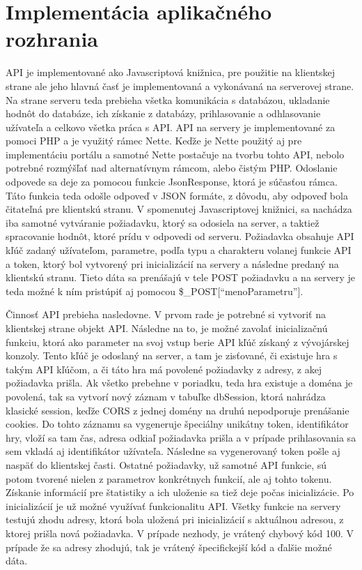 \section{Implementácia aplikačného rozhrania}
API je implementované ako Javascriptová knižnica, pre použitie na klientskej strane ale jeho hlavná časť je implementovaná a vykonávaná na serverovej strane. Na strane serveru teda prebieha všetka komunikácia s databázou, ukladanie hodnôt do databáze, ich získanie z databázy, prihlasovanie a odhlasovanie užívateľa a celkovo všetka práca s API. API na servery je implementované za pomoci PHP a je využitý rámec Nette. Keďže je Nette použitý aj pre implementáciu portálu a samotné Nette postačuje na tvorbu tohto API, nebolo potrebné rozmýšľať nad alternatívnym rámcom, alebo čistým PHP. Odoslanie odpovede sa deje za pomocou funkcie JsonResponse, ktorá je súčasťou rámca. Táto funkcia teda odošle odpoveď v JSON formáte, z dôvodu, aby odpoveď bola čitateľná pre klientskú stranu.  V spomenutej Javascriptovej knižnici, sa nachádza iba samotné vytváranie požiadavku, ktorý sa odosiela na server, a taktiež spracovanie hodnôt, ktoré prídu v odpovedi od serveru. Požiadavka obsahuje API kľúč zadaný užívateľom, parametre, podľa typu a charakteru volanej funkcie API a token, ktorý bol vytvorený pri inicializácií na servery a následne predaný na klientskú stranu. Tieto dáta sa prenášajú v tele POST požiadavku a na servery je teda možné k ním pristúpiť aj pomocou \$\_POST[“menoParametru”].  

Činnosť API prebieha nasledovne. V prvom rade je potrebné si vytvoriť na klientskej strane objekt API. Následne na to, je možné zavolať inicializačnú funkciu, ktorá ako parameter na svoj vstup berie API kľúč získaný z vývojárskej konzoly. Tento kľúč je odoslaný na server, a tam je zisťované, či existuje hra s takým API kľúčom, a či táto hra má povolené požiadavky z adresy, z akej požiadavka prišla. Ak všetko prebehne v poriadku, teda hra existuje a doména je povolená, tak sa vytvorí nový záznam v tabuľke dbSession, ktorá nahrádza klasické session, keďže CORS z jednej domény na druhú nepodporuje prenášanie cookies. Do tohto záznamu sa vygeneruje špeciálny unikátny token, identifikátor hry, vloží sa tam čas, adresa odkiaľ požiadavka prišla a v prípade prihlasovania sa sem vkladá aj identifikátor užívateľa.  Následne sa vygenerovaný token pošle aj naspäť do klientskej časti. Ostatné požiadavky, už samotné API funkcie, sú potom tvorené nielen z parametrov konkrétnych funkcií, ale aj tohto tokenu. Získanie informácií pre štatistiky  a ich uloženie sa tiež deje počas inicializácie. Po inicializácií je už možné využívať funkcionalitu API. Všetky funkcie na servery testujú zhodu adresy, ktorá bola uložená pri inicializácií s aktuálnou adresou, z ktorej prišla nová požiadavka. V prípade nezhody, je vrátený chybový kód 100. V prípade že sa adresy zhodujú, tak je vrátený špecifickejší kód a ďalšie možné dáta.

